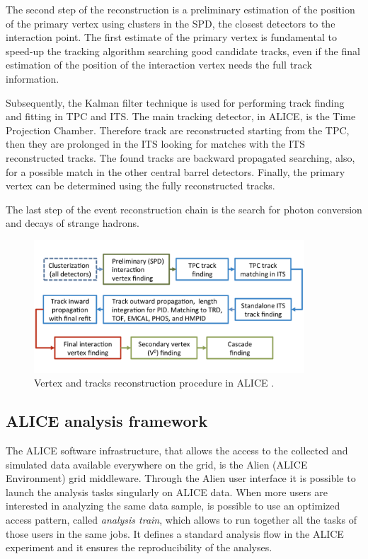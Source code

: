 The second step of the reconstruction is a preliminary estimation of the position of the primary
vertex using clusters in the SPD, the closest detectors to the interaction point.
The first estimate of the primary vertex is fundamental to speed-up the tracking algorithm searching
good candidate tracks, even if the final estimation of the position of the interaction vertex
needs the full track information.

Subsequently, the Kalman filter technique \cite{kalman} is used for performing track finding and
fitting in TPC and ITS. 
The main tracking detector, in ALICE, is the Time Projection Chamber. Therefore track are reconstructed 
starting from the TPC, then they are prolonged in the ITS looking for matches with the ITS 
reconstructed tracks. 
The found tracks are backward propagated searching, also, for a possible match in the other central
barrel detectors.
Finally, the primary vertex can be determined using the fully reconstructed tracks.

The last step of the event reconstruction chain is the search for photon conversion and decays of
strange hadrons.

\begin{figure}
    \captionsetup{justification=centering}
    \centering
    \includegraphics[width=0.9\textwidth]{gfx/reconstruction}
	\caption{Vertex and tracks reconstruction procedure in ALICE \cite{alice:Perf2014}.}
	\label{fig:rec_flow}
\end{figure}

%
\subsection{ALICE analysis framework} \label{sec:anal_frame}

The ALICE software infrastructure, that allows the access to the collected and simulated data 
available everywhere on the grid, is the Alien (ALICE Environment) \cite{alien} grid middleware.
Through the Alien user interface it is possible to launch the analysis tasks singularly on ALICE data. 
When more users are interested in analyzing the same data sample, is possible to use an optimized
access pattern, called \textit{analysis train}, which allows to run together all the tasks
of those users in the same jobs.
It defines a standard analysis flow in the ALICE experiment and it ensures the reproducibility of the
analyses.

